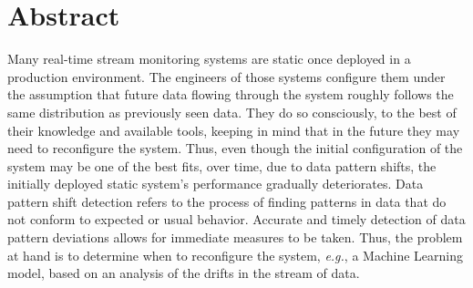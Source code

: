 \chapter*{Abstract}





Many real-time stream monitoring systems are static once deployed in a production environment. The engineers of those systems configure them under the assumption that future data flowing through the system roughly follows the same distribution as previously seen data. They do so consciously, to the best of their knowledge and available tools, keeping in mind that in the future they may need to reconfigure the system. Thus, even though the initial configuration of the system may be one of the best fits, over time, due to data pattern shifts, the initially deployed static system's performance gradually deteriorates. Data pattern shift detection refers to the process of finding patterns in data that do not conform to expected or usual behavior. Accurate and timely detection of data pattern deviations allows for immediate measures to be taken. Thus, the problem at hand is to determine when to reconfigure the system, \textit{e.g.}, a Machine Learning model, based on an analysis of the drifts in the stream of data.

